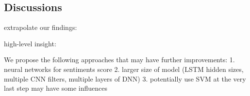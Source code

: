\documentclass[12pt]{diazessay} %
\begin{document}







\subsection{Discussions}
extrapolate our findings:

high-level insight:



We propose the following approaches that may have further improvements:
1. neural networks for sentiments score
2. larger size of model (LSTM hidden sizes, multiple CNN filters, multiple layers of DNN)
3. potentially use SVM at the very last step may have some influences




\clearpage






\newpage
\appendix
\end{document}
